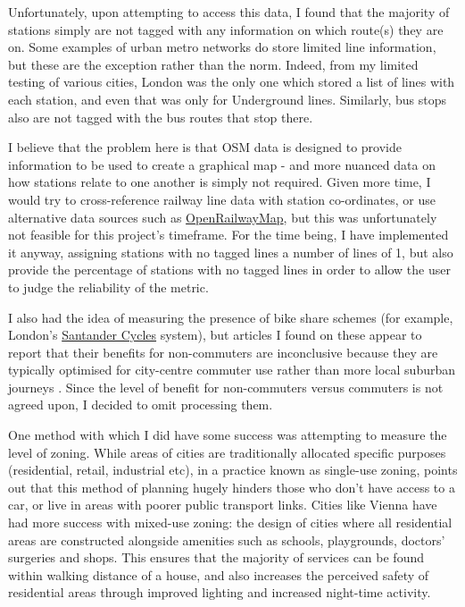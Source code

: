 \documentclass[11pt]{article} %
\begin{document}
Unfortunately, upon attempting to access this data, I found that the majority of stations simply are not tagged with any information on which route(s) they are on. Some examples of urban metro networks do store limited line information, but these are the exception rather than the norm. Indeed, from my limited testing of various cities, London was the only one which stored a list of lines with each station, and even that was only for Underground lines. Similarly, bus stops also are not tagged with the bus routes that stop there.

I believe that the problem here is that OSM data is designed to provide information to be used to create a graphical map - and more nuanced data on how stations relate to one another is simply not required. Given more time, I would try to cross-reference railway line data with station co-ordinates, or use alternative data sources such as \href{https://www.openrailwaymap.org/}{OpenRailwayMap}, but this was unfortunately not feasible for this project's timeframe. For the time being, I have implemented it anyway, assigning stations with no tagged lines a number of lines of 1, but also provide the percentage of stations with no tagged lines in order to allow the user to judge the reliability of the metric.

I also had the idea of measuring the presence of bike share schemes (for example, London's \href{https://tfl.gov.uk/modes/cycling/santander-cycles}{Santander Cycles} system), but articles I found on these appear to report that their benefits for non-commuters are inconclusive because they are typically optimised for city-centre commuter use rather than more local suburban journeys \parencite{Beecham2014}. Since the level of benefit for non-commuters versus commuters is not agreed upon, I decided to omit processing them.

One method with which I did have some success was attempting to measure the level of zoning. While areas of cities are traditionally allocated specific purposes (residential, retail, industrial etc), in a practice known as single-use zoning, \cite{Perez2019} points out that this method of planning hugely hinders those who don't have access to a car, or live in areas with poorer public transport links. Cities like Vienna have had more success with mixed-use zoning: the design of cities where all residential areas are constructed alongside amenities such as schools, playgrounds, doctors' surgeries and shops. This ensures that the majority of services can be found within walking distance of a house, and also increases the perceived safety of residential areas through improved lighting and increased night-time activity.
\end{document}
